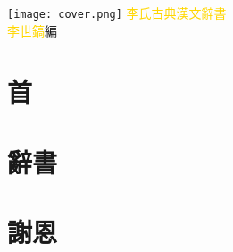 \documentclass[a5paper,11pt]{report}
\begin{document}
\begin{titlepage}
\doublespacing
\vspace{20mm}
\hspace{-30mm}
\texttt{[image: cover.png]}
\addtolength{\rightmargin}{20mm}
\addtolength{\leftmargin}{20mm}
\hfill
\vfill
{\huge\textcolor{gold}{李氏古典漢文辭書}}\\
{\textcolor{gold}{李世鎬}\hspace{14pt}編}
\vspace{64pt}
\end{titlepage}
\newpage
\chapter*{首}
\doublespacing


\chapter*{辭書}
\begin{multicols}{2}
\begin{flushleft}
\onehalfspacing

\end{flushleft}
\end{multicols}

\chapter*{謝恩}
\doublespacing

\end{document}
